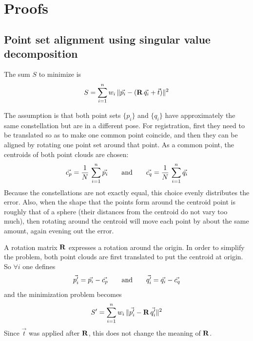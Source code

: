 \chapter{Proofs}

\section{Point set alignment using singular value decomposition} \label{sec:lsq_align}
The sum $S$ to minimize is
\begin{equation}
S = \sum_{i=1}^{n} w_i \, \| \vec{p_i} - (\mathbf{R} \, \vec{q_i} + \vec{t}) \|^2
\end{equation}

The assumption is that both point sets $\{ p_i \}$ and $\{ q_i \}$ have approximately the same constellation but are in a different pose. For registration, first they need to be translated so as to make one common point coincide, and then they can be aligned by rotating one point set around that point. As a common point, the centroids of both point clouds are chosen:
\begin{equation}
\vec{c_p} = \frac{1}{N} \, \sum_{i=1}^{n} \vec{p_i}
\hspace{7mm} \text{and} \hspace{7mm}
\vec{c_q} = \frac{1}{N} \, \sum_{i=1}^{n} \vec{q_i}
\end{equation}
Because the constellations are not exactly equal, this choice evenly distributes the error. Also, when the shape that the points form around the centroid point is roughly that of a sphere (their distances from the centroid do not vary too much), then rotating around the centroid will move each point by about the same amount, again evening out the error. 

A rotation matrix $\mathbf{R}$ expresses a rotation around the origin. In order to simplify the problem, both point clouds are first translated to put the centroid at origin. So $\forall i$ one defines
\begin{equation}
\vec{p'_i} = \vec{p_i} - \vec{c_p}
\hspace{7mm} \text{and} \hspace{7mm}
\vec{q'_i} = \vec{q_i} - \vec{c_q}
\end{equation}
and the minimization problem becomes
\begin{equation} \label{eq:lsq_align_meaneds}
S' = \sum_{i=1}^{n} w_i \, \| \vec{p'_i} - \mathbf{R} \, \vec{q'_i} \|^2
\end{equation}
Since $\vec{t}$ was applied after $\mathbf{R}$, this does not change the meaning of $\mathbf{R}$.

